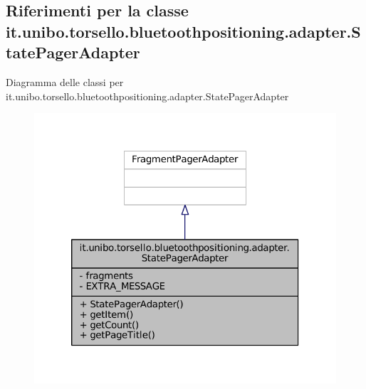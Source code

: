 \hypertarget{classit_1_1unibo_1_1torsello_1_1bluetoothpositioning_1_1adapter_1_1StatePagerAdapter}{}\subsection{Riferimenti per la classe it.\+unibo.\+torsello.\+bluetoothpositioning.\+adapter.\+State\+Pager\+Adapter}
\label{classit_1_1unibo_1_1torsello_1_1bluetoothpositioning_1_1adapter_1_1StatePagerAdapter}


Diagramma delle classi per it.\+unibo.\+torsello.\+bluetoothpositioning.\+adapter.\+State\+Pager\+Adapter
\nopagebreak
\begin{figure}[H]
\begin{center}
\leavevmode
\includegraphics[width=320pt]{classit_1_1unibo_1_1torsello_1_1bluetoothpositioning_1_1adapter_1_1StatePagerAdapter__inherit__graph}
\end{center}
\end{figure}


